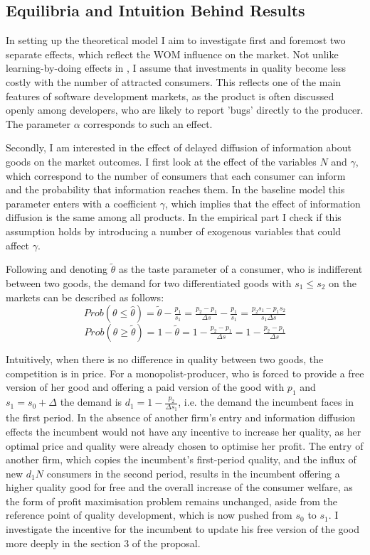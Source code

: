 \documentclass[13pt]{article}
\numberwithin{figure}{section}
\numberwithin{table}{section}
\theoremstyle{indented}
\numberwithin{equation}{section} %
\begin{document}
\subsection{Equilibria and Intuition Behind Results} \label{results}

In setting up the theoretical model I aim to investigate first and foremost two separate effects, which reflect the WOM influence on the market. Not unlike learning-by-doing effects in \citet{Tirole}, I assume that investments in quality become less costly with the number of attracted consumers. This reflects one of the main features of software development markets, as the product is often discussed openly among developers, who are likely to report 'bugs' directly to the producer. The parameter $\alpha$ corresponds to such an effect. 
 
Secondly, I am interested in the effect of delayed diffusion of information about goods on the market outcomes. I first look at the effect of the variables $N$ and $\gamma$, which correspond to the number of consumers that each consumer can inform and the probability that information reaches them. In the baseline model this parameter enters with a coefficient $\gamma$, which implies that the effect of information diffusion is the same among all products. In the empirical part I check if this assumption holds by introducing a number of exogenous variables that could affect $\gamma$.

Following \citet{Tirole} and denoting $\tilde{\theta}$ as the taste parameter of a consumer, who is indifferent between two goods, the demand for two differentiated goods with $s_1 \leq s_2$ on the markets can be described as follows: 
$$Prob(\theta \leq \hat{\theta}) = \tilde{\theta} - \tfrac{p_1}{s_1} = \tfrac{p_2-p_1}{\Delta s} - \tfrac{p_1}{s_1} = \tfrac{p_2s_1 - p_1s_2}{s_1\Delta s}$$ 
$$Prob(\theta \geq \tilde{\theta}) = 1 - \tilde{\theta} = 1 - \tfrac{p_2-p_1}{\Delta s} = 1 - \tfrac{p_2 - p_1}{\Delta s}$$
      
Intuitively, when there is no difference in quality between two goods, the competition is in price. For a monopolist-producer, who is forced to provide a free version of her good and offering a paid version of the good with $p_1$ and $s_1 = s_0 + \Delta$ the demand is $d_1 = 1 - \tfrac{p_2}{\Delta s_1}$, i.e. the demand the incumbent faces in the first period. In the absence of another firm's entry and information diffusion effects the incumbent would not have any incentive to increase her quality, as her optimal price and quality were already chosen to optimise her profit. The entry of another firm, which copies the incumbent's first-period quality, and the influx of new $d_1N$ consumers in the second period, results in the incumbent offering a higher quality good for free and the overall increase of the consumer welfare, as the form of profit maximisation problem remains unchanged, aside from the reference point of quality development, which is now pushed from $s_0$ to $s_1$. I investigate the incentive for the incumbent to update his free version of the good more deeply in the section 3 of the proposal.
\end{document}
